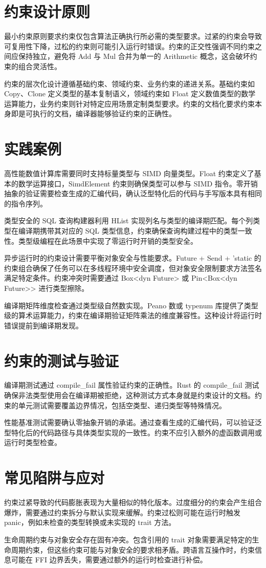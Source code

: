 \chapter{约束设计原则}
最小约束原则要求约束仅包含算法正确执行所必需的类型要求。过紧的约束会导致可复用性下降，过松的约束则可能引入运行时错误。约束的正交性强调不同约束之间应保持独立，避免将 Add 与 Mul 合并为单一的 Arithmetic 概念，这会破坏约束的组合灵活性。\par
约束的层次化设计遵循基础约束、领域约束、业务约束的递进关系。基础约束如 Copy、Clone 定义类型的基本复制语义，领域约束如 Float 定义数值类型的数学运算能力，业务约束则针对特定应用场景定制类型要求。约束的文档化要求约束本身即是可执行的文档，编译器能够验证约束的正确性。\par
\chapter{实践案例}
高性能数值计算库需要同时支持标量类型与 SIMD 向量类型。Float 约束定义了基本的数学运算接口，SimdElement 约束则确保类型可以参与 SIMD 指令。零开销抽象的验证需要检查生成的汇编代码，确认泛型特化后的代码与手写版本具有相同的指令序列。\par
类型安全的 SQL 查询构建器利用 HList 实现列名与类型的编译期匹配。每个列类型在编译期携带其对应的 SQL 类型信息，约束确保查询构建过程中的类型一致性。类型级编程在此场景中实现了零运行时开销的类型安全。\par
异步运行时的约束设计需要平衡对象安全与性能要求。Future + Send + 'static 的约束组合确保了任务可以在多线程环境中安全调度，但对象安全限制要求方法签名满足特定条件。约束冲突时需要通过 Box<dyn Future> 或 Pin<Box<dyn Future>> 进行类型擦除。\par
编译期矩阵维度检查通过类型级自然数实现。Peano 数或 typenum 库提供了类型级的算术运算能力，约束在编译期验证矩阵乘法的维度兼容性。这种设计将运行时错误提前到编译期发现。\par
\chapter{约束的测试与验证}
编译期测试通过 compile\_{}fail 属性验证约束的正确性。Rust 的 compile\_{}fail 测试确保非法类型使用会在编译期被拒绝，这种测试方式本身就是约束设计的文档。约束的单元测试需要覆盖边界情况，包括空类型、递归类型等特殊情况。\par
性能基准测试需要确认零抽象开销的承诺。通过查看生成的汇编代码，可以验证泛型特化后的代码路径与具体类型实现的一致性。约束不应引入额外的虚函数调用或运行时类型检查。\par
\chapter{常见陷阱与应对}
约束过紧导致的代码膨胀表现为大量相似的特化版本。过度细分的约束会产生组合爆炸，需要通过约束拆分与默认实现来缓解。约束过松则可能在运行时触发 panic，例如未检查的类型转换或未实现的 trait 方法。\par
生命周期约束与对象安全存在固有冲突。包含引用的 trait 对象需要满足特定的生命周期约束，但这些约束可能与对象安全的要求相矛盾。跨语言互操作时，约束信息可能在 FFI 边界丢失，需要通过额外的运行时检查进行补偿。\par
